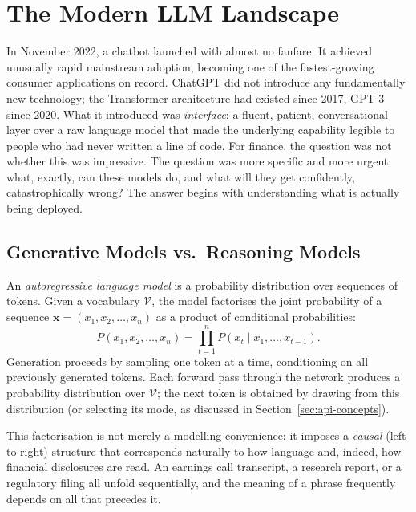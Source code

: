 \section{The Modern LLM Landscape}
\label{sec:landscape}

\begin{context}

In November 2022, a chatbot launched with almost no fanfare.  It achieved unusually rapid mainstream adoption, becoming one of the fastest-growing consumer applications on record.  ChatGPT did not introduce any fundamentally new technology; the
Transformer architecture had existed since 2017, GPT-3 since 2020.  What it
introduced was \emph{interface}: a fluent, patient, conversational layer over a
raw language model that made the underlying capability legible to people who had
never written a line of code.  For finance, the question was not whether this was
impressive.  The question was more specific and more urgent: what, exactly, can
these models do, and what will they get confidently, catastrophically wrong?  The
answer begins with understanding what is actually being deployed.

\subsection{Generative Models vs.\ Reasoning Models}
\label{sec:landscape-genreason}

\begin{definition}
\label{def:autoregressive}
An \emph{autoregressive language model} is a probability distribution over sequences
of tokens.  Given a vocabulary $\mathcal{V}$, the model factorises the joint
probability of a sequence $\mathbf{x} = (x_1, x_2, \ldots, x_n)$ as a product of
conditional probabilities:
\begin{equation}
  P(x_1, x_2, \ldots, x_n) = \prod_{t=1}^{n} P\!\left(x_t \mid x_1, \ldots, x_{t-1}\right).
  \label{eq:autoregressive}
\end{equation}
Generation proceeds by sampling one token at a time, conditioning on all previously
generated tokens.  Each forward pass through the network produces a probability
distribution over $\mathcal{V}$; the next token is obtained by drawing from this
distribution (or selecting its mode, as discussed in
Section~\ref{sec:api-concepts}).
\end{definition}

This factorisation is not merely a modelling convenience: it imposes a \emph{causal}
(left-to-right) structure that corresponds naturally to how language and, indeed, how
financial disclosures are read.  An earnings call transcript, a research report, or a
regulatory filing all unfold sequentially, and the meaning of a phrase frequently
depends on all that precedes it.


\end{context}
